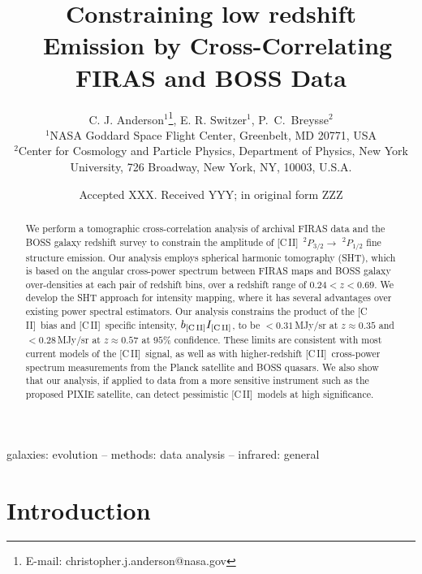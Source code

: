 \documentclass[fleqn,usenatbib]{mnras}
\title[FIRASxBOSS \cii\ IM Constraints]{Constraining low redshift \cii\ Emission by Cross-Correlating FIRAS and BOSS Data}
\author[C. J. Anderson et al.]{
C. J. Anderson$^{1}$\thanks{E-mail: christopher.j.anderson@nasa.gov}, E. R. Switzer$^{1}$,
P.~C.~Breysse$^{2}$\\
$^{1}$NASA Goddard Space Flight Center, Greenbelt, MD 20771, USA\\
$^{2}$Center for Cosmology and Particle Physics, Department of Physics, New York University, 726 Broadway, New York, NY, 10003, U.S.A.}
\date{Accepted XXX. Received YYY; in original form ZZZ}
\newcommand{\cii}{[C{\sc\,II}]}
\begin{document}
\label{firstpage}
\pagerange{\pageref{firstpage}--\pageref{lastpage}}
\maketitle

\begin{abstract}
We perform a tomographic cross-correlation analysis of archival FIRAS data and the BOSS galaxy redshift survey
to constrain the amplitude of \cii\ $^2P_{3/2}\rightarrow$ $^2P_{1/2}$ fine structure emission. Our analysis employs spherical harmonic tomography (SHT), which is based on the angular cross-power spectrum between FIRAS maps and BOSS galaxy over-densities at each pair of redshift bins, over a redshift range of $0.24<z<0.69$. We develop the SHT approach for intensity mapping, where it has several advantages over existing power spectral estimators. Our analysis constrains the product of the \cii\ bias and \cii\ specific intensity, $b_{\rm \cii}I_{\rm \cii}$, to be $<0.31$\,MJy/sr at $z {\approx} 0.35$ and $<0.28$\,MJy/sr at $z {\approx} 0.57$ at $95\%$ confidence. These limits are consistent with most current models of the \cii\ signal, as well as with higher-redshift \cii\ cross-power spectrum measurements from the Planck satellite and BOSS quasars.  We also show that our analysis, if applied to data from a more sensitive instrument such as the proposed PIXIE satellite, can detect pessimistic \cii\ models at high significance.
\end{abstract} 

\begin{keywords}
galaxies: evolution -- methods: data analysis -- infrared: general
\end{keywords}

\section{Introduction}
\label{sec:introduction}
\end{document}
